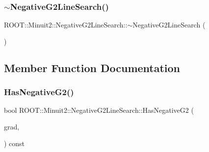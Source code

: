 \subsubsection{\texorpdfstring{$\sim$NegativeG2LineSearch()}{~NegativeG2LineSearch()}\hspace{0.1cm}{\footnotesize\ttfamily [3/3]}}
{\footnotesize\ttfamily R\+O\+O\+T\+::\+Minuit2\+::\+Negative\+G2\+Line\+Search\+::$\sim$\+Negative\+G2\+Line\+Search (\begin{DoxyParamCaption}{ }\end{DoxyParamCaption})\hspace{0.3cm}{\ttfamily [inline]}}



\subsection{Member Function Documentation}
\mbox{\label{classROOT_1_1Minuit2_1_1NegativeG2LineSearch_a5450b0e5a0144e9c3e6028e8ae4a2c76}} 
\subsubsection{\texorpdfstring{HasNegativeG2()}{HasNegativeG2()}\hspace{0.1cm}{\footnotesize\ttfamily [1/3]}}
{\footnotesize\ttfamily bool R\+O\+O\+T\+::\+Minuit2\+::\+Negative\+G2\+Line\+Search\+::\+Has\+Negative\+G2 (\begin{DoxyParamCaption}\item[{const \mbox{\hyperlink{classROOT_1_1Minuit2_1_1FunctionGradient}{Function\+Gradient}} \&}]{grad,  }\item[{const \mbox{\hyperlink{classROOT_1_1Minuit2_1_1MnMachinePrecision}{Mn\+Machine\+Precision}} \&}]{ }\end{DoxyParamCaption}) const}

